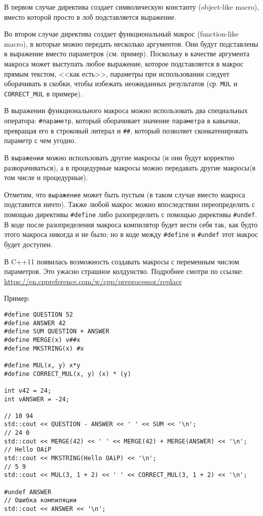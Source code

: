 \documentclass[14pt, a4paper]{extarticle}
\begin{document}
В первом случае директива создает символическую константу (object-like macro),
вместо которой просто в лоб подставляется выражение.

Во втором случае директива создает функциональный макрос (function-like macro),
в которые можно передать несколько аргументов. Они будут подставлены в выражение
вместо параметров (см. пример). Поскольку в качестве аргумента макроса может
выступать любое выражение, которое подставляется в макрос прямым текстом, <<как есть>>,
параметры при использовании следует оборачивать в скобки, чтобы избежать неожиданных результатов
(ср. \verb|MUL| и \verb|CORRECT_MUL| в примере).

В выражении функционального макроса можно использовать два специальных оператора:
\verb|#параметр|, который оборачивает значение \verb|параметра| в кавычки,
превращая его в строковый литерал и \verb|##|, который позволяет сконкатенировать
параметр с чем угодно.

В \verb|выражении| можно использовать другие макросы (и они будут корректно разворачиваться),
а в процедурные макросы можно передавать другие макросы(в том числе и процедурные).

Отметим, что \verb|выражение| может быть пустым (в таком случае
вместо макроса подставится ничто). Также любой макрос можно впоследствии переопределить
с помощью директивы \verb|#define| либо разопределить с помощью директивы \verb|#undef|.
В коде после разопределения макроса компилятор будет вести себя так, как будто этого
макроса никогда и не было; но в коде между \verb|#define| и \verb|#undef| этот макрос
будет доступен.

{\small В C++11 появилась возможность создавать макросы с переменным числом параметров.
Это ужасно страшное колдунство. Подробнее смотри по ссылке:
\url{https://en.cppreference.com/w/cpp/preprocessor/replace}}

Пример:
\begin{verbatim}
#define QUESTION 52
#define ANSWER 42
#define SUM QUESTION + ANSWER
#define MERGE(x) v##x
#define MKSTRING(x) #x

#define MUL(x, y) x*y
#define CORRECT_MUL(x, y) (x) * (y)

int v42 = 24;
int vANSWER = -24;

// 10 94
std::cout << QUESTION - ANSWER << ' ' << SUM << '\n';
// 24 0
std::cout << MERGE(42) << ' ' << MERGE(42) + MERGE(ANSWER) << '\n';
// Hello OAiP
std::cout << MKSTRING(Hello OAiP) << '\n';
// 5 9
std::cout << MUL(3, 1 + 2) << ' ' << CORRECT_MUL(3, 1 + 2) << '\n';

#undef ANSWER
// Ошибка компиляции
std::cout << ANSWER << '\n';
\end{verbatim}
\end{document}
